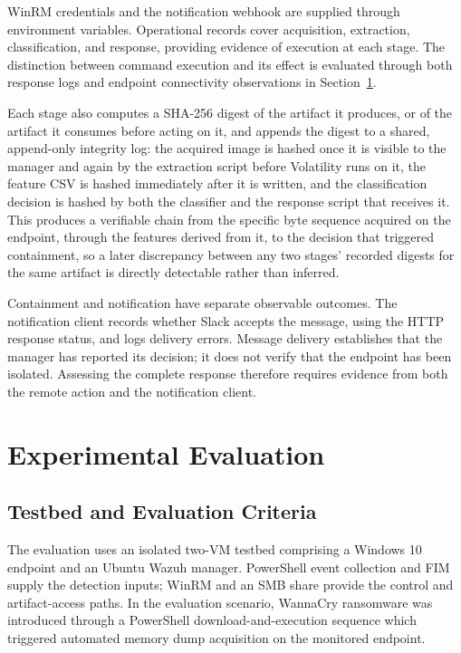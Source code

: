 \documentclass[conference]{IEEEtran}
\begin{document}
WinRM credentials and the notification webhook are supplied through environment variables. Operational records cover acquisition, extraction, classification, and response, providing evidence of execution at each stage. The distinction between command execution and its effect is evaluated through both response logs and endpoint connectivity observations in Section~\ref{sec:case}.

Each stage also computes a SHA-256 digest of the artifact it produces, or
of the artifact it consumes before acting on it, and appends the digest to
a shared, append-only integrity log: the acquired image is hashed once it
is visible to the manager and again by the extraction script before
Volatility runs on it, the feature CSV is hashed immediately after it is
written, and the classification decision is hashed by both the classifier
and the response script that receives it. This produces a verifiable
chain from the specific byte sequence acquired on the endpoint, through
the features derived from it, to the decision that triggered containment,
so a later discrepancy between any two stages' recorded digests for the
same artifact is directly detectable rather than inferred.

Containment and notification have separate observable outcomes. The
notification client records whether Slack accepts the message, using the HTTP
response status, and logs delivery errors. Message delivery establishes that
the manager has reported its decision; it does not verify that the endpoint
has been isolated. Assessing the complete response therefore requires evidence
from both the remote action and the notification client.

\section{Experimental Evaluation}
\label{sec:case}

\subsection{Testbed and Evaluation Criteria}
The evaluation uses an isolated two-VM testbed comprising a Windows 10 endpoint and an Ubuntu Wazuh manager. PowerShell event collection and FIM supply the detection inputs; WinRM and an SMB share provide the control and artifact-access paths. In the evaluation scenario, WannaCry ransomware was introduced through a PowerShell download-and-execution sequence which triggered automated memory dump acquisition on the monitored endpoint.
\end{document}
